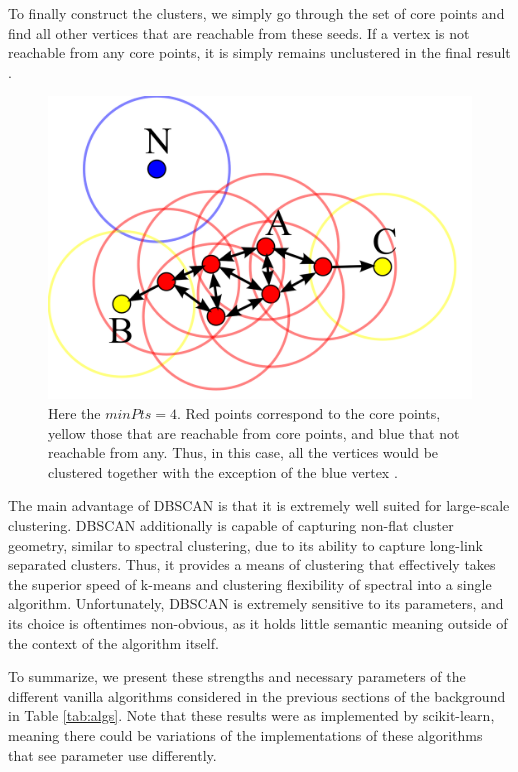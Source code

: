 \documentclass{article}
\begin{document}
To finally construct the clusters, we simply go through the set of core points and find all other vertices that are reachable from these seeds. If a vertex is not reachable from any core points, it is simply remains unclustered in the final result \cite{dbscan}.

\begin{figure}
    \label{fig:dbscan}
    \centering
    \includegraphics[width=.50\textwidth]{dbscan.png}
    \caption[DBSCAN Clustering]{Here the $minPts=4$. Red points correspond to the core points, yellow those that are reachable from core points, and blue that not reachable from any. Thus, in this case, all the vertices would be clustered together with the exception of the blue vertex \cite{wiki-dbscan}.}
\end{figure}

The main advantage of DBSCAN is that it is extremely well suited for large-scale clustering. DBSCAN additionally is capable of capturing non-flat cluster geometry, similar to spectral clustering, due to its ability to capture long-link separated clusters. Thus, it provides a means of clustering that effectively takes the superior speed of k-means and clustering flexibility of spectral into a single algorithm. Unfortunately, DBSCAN is extremely sensitive to its parameters, and its choice is oftentimes non-obvious, as it holds little semantic meaning outside of the context of the algorithm itself.

To summarize, we present these strengths and necessary parameters of the different vanilla algorithms considered in the previous sections of the background in Table \ref{tab:algs}. Note that these results were as implemented by scikit-learn, meaning there could be variations of the implementations of these algorithms that see parameter use differently.
\end{document}
